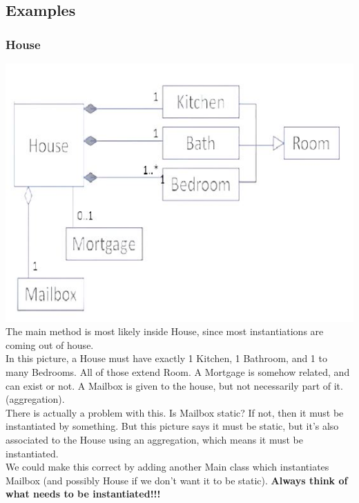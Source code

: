 \documentclass[12pt]{article}
\theoremstyle{definition}
\begin{document}
\subsection{Examples}
\subsubsection{House}
	\includegraphics[]{house}
	\\
	The main method is most likely inside House, since most instantiations are coming out of house.
	\\ \linebreak
	In this picture, a House must have exactly 1 Kitchen, 1 Bathroom, and 1 to many Bedrooms. All of those extend Room. A Mortgage is somehow related, and can exist or not. A Mailbox is given to the house, but not necessarily part of it. (aggregation).
	\\ \linebreak
	There is actually a problem with this. Is Mailbox static? If not, then it must be instantiated by something. But this picture says it must be static, but it's also associated to the House using an aggregation, which means it must be instantiated.
	\\ \linebreak
	We could make this correct by adding another Main class which instantiates Mailbox (and possibly House if we don't want it to be static).
	\textbf{Always think of what needs to be instantiated!!!}
\end{document}
